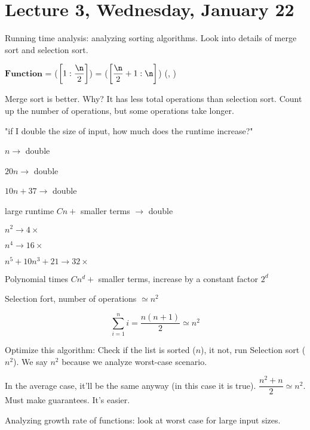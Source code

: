 \section{Lecture 3, Wednesday, January 22}


Running time analysis: analyzing sorting algorithms. Look into details of merge
sort and selection sort.


\begin{algorithm}[Algorithm]
\SetAlgoLined
\DontPrintSemicolon
$\mathbf{Function}$ \MergeSort{\Array \A$[1:\n]$}\;
\B = \MergeSort(\A$\left[1:\dfrac{\n}{2}\right]$)\;
\C = \MergeSort(\B$\left[\dfrac{\n}{2} + 1:\n\right]$)\;
\Return \Merge(\B, \C)\;
\end{algorithm}



Merge sort is better. Why? It has less total operations than selection sort. Count up the number of operations, but some operations take longer.



"if I double the size of input, how much does the runtime increase?"

$n \rightarrow$ double

$20n \rightarrow$ double

$10n + 37 \rightarrow$ double

large runtime $Cn +$ smaller terms $\rightarrow$ double

$n^2 \rightarrow 4\times$

$n^4 \rightarrow 16\times$

$n^5 + 10n^3 + 21 \rightarrow 32\times$

Polynomial times $Cn^d +$ smaller terms, increase by a constant factor $2^d$

Selection fort, number of operations $\simeq n^2$

$$ \sum_{i = 1}^n i = \dfrac{n(n + 1)}{2} \simeq n^2$$

Optimize this algorithm: Check if the list is sorted ($n$), it not, run Selection sort ($n^2$). We say $n^2$ because we analyze worst-case scenario.

In the average case, it'll be the same anyway (in this case it is true). $\dfrac{n^2 + n}{2} \simeq n^2$. Must make guarantees. It's easier.


Analyzing growth rate of functions: look at worst case for large input sizes.

